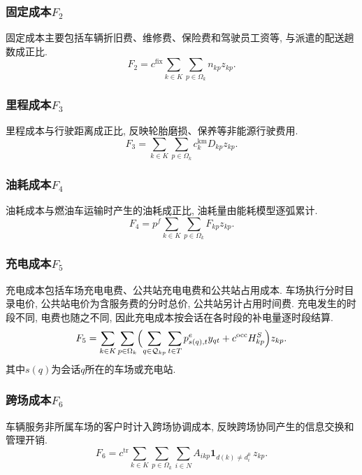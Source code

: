 \documentclass{setp-new}
\begin{document}
\subsubsection{固定成本\texorpdfstring{$F_2$}{F2}}
固定成本主要包括车辆折旧费、维修费、保险费和驾驶员工资等, 与派遣的配送趟数成正比.
\begin{equation}
F_2=c^{\mathrm{fix}}\sum_{k\in K}\sum_{p\in\Omega_k}n_{kp}z_{kp}.
\label{eq:F2}
\end{equation}

\subsubsection{里程成本\texorpdfstring{$F_3$}{F3}}
里程成本与行驶距离成正比, 反映轮胎磨损、保养等非能源行驶费用.
\begin{equation}
F_3=\sum_{k\in K}\sum_{p\in\Omega_k}c_k^{\mathrm{km}}D_{kp}z_{kp}.
\label{eq:F3}
\end{equation}

\subsubsection{油耗成本\texorpdfstring{$F_4$}{F4}}
油耗成本与燃油车运输时产生的油耗成正比, 油耗量由能耗模型逐弧累计.
\begin{equation}
F_4=p^f\sum_{k\in K}\sum_{p\in\Omega_k}F_{kp}z_{kp}.
\label{eq:F4}
\end{equation}

\subsubsection{充电成本\texorpdfstring{$F_5$}{F5}}
充电成本包括车场充电电费、公共站充电电费和公共站占用成本.
车场执行分时目录电价, 公共站电价为含服务费的分时总价, 公共站另计占用时间费.
充电发生的时段不同, 电费也随之不同, 因此充电成本按会话在各时段的补电量逐时段结算.
\begin{equation}
F_5=\sum_{k\in K}\sum_{p\in\Omega_k}\Bigl(\sum_{q\in\mathcal Q_{kp}}\sum_{t\in T}p_{s(q),t}^{e}y_{qt}
+c^{\mathrm{occ}}H_{kp}^{S}\Bigr)z_{kp}.
\label{eq:F5}
\end{equation}
其中$s(q)$为会话$q$所在的车场或充电站.

\subsubsection{跨场成本\texorpdfstring{$F_6$}{F6}}
车辆服务非所属车场的客户时计入跨场协调成本,
反映跨场协同产生的信息交换和管理开销.
\begin{equation}
F_6=c^{\mathrm{tr}}\sum_{k\in K}\sum_{p\in\Omega_k}\sum_{i\in N}A_{ikp}\mathbf 1_{d(k)\neq d_i^0}\,z_{kp}.
\label{eq:F6}
\end{equation}
\end{document}
